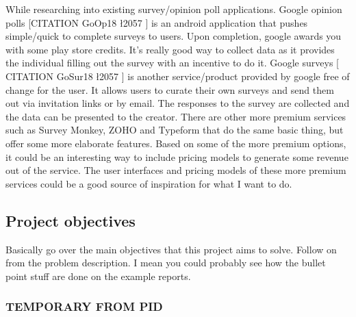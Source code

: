 While researching into existing survey/opinion poll applications.
Google opinion polls [CITATION GoOp18 \l 2057 ] is an android application that pushes simple/quick to complete surveys to users. Upon completion, google awards you with some play store credits. It’s really good way to collect data as it provides the individual filling out the survey with an incentive to do it.
Google surveys [ CITATION GoSur18 \l 2057 ] is another service/product provided by google free of change for the user. It allows users to curate their own surveys and send them out via invitation links or by email. The responses to the survey are collected and the data can be presented to the creator. There are other more premium services such as Survey Monkey, ZOHO and Typeform that do the same basic thing, but offer some more elaborate features. Based on some of the more premium options, it could be an interesting way to include pricing models to generate some revenue out of the service. The user interfaces and pricing models of these more premium services could be a good source of inspiration for what I want to do. 

\subsection{Project objectives} 
Basically go over the main objectives that this project aims to solve.
Follow on from the problem description.
I mean you could probably see how the bullet point stuff are done on the example reports.


\subsubsection{\textbf{TEMPORARY FROM PID}}

